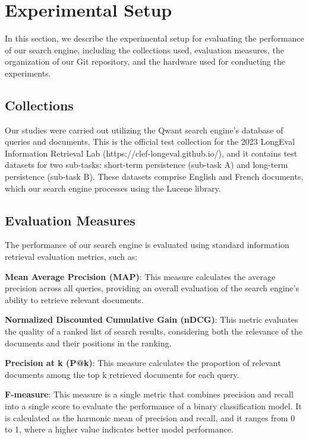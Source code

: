 \section{Experimental Setup}
\label{sec:setup}

In this section, we describe the experimental setup for evaluating the performance of our search engine, including the collections used, evaluation measures, the organization of our Git repository, and the hardware used for conducting the experiments.

\subsection{Collections}
Our studies were carried out utilizing the Qwant search engine's database of queries and documents. This is the official test collection for the 2023 LongEval Information Retrieval Lab (https://clef-longeval.github.io/)\cite{CLEFLongEval}, and it contains test datasets for two sub-tasks: short-term persistence (sub-task A) and long-term persistence (sub-task B). These datasets comprise English and French documents, which our search engine processes using the Lucene library.

\subsection{Evaluation Measures}
The performance of our search engine is evaluated using standard information retrieval evaluation metrics, such as:

\noindent\textbf{Mean Average Precision (MAP)}: This measure calculates the average precision across all queries, providing an overall evaluation of the search engine's ability to retrieve relevant documents.

\noindent\textbf{Normalized Discounted Cumulative Gain (nDCG)}: This metric evaluates the quality of a ranked list of search results, considering both the relevance of the documents and their positions in the ranking.

\noindent\textbf{Precision at k (P@k)}: This measure calculates the proportion of relevant documents among the top k retrieved documents for each query.

\noindent\textbf{F-measure}: This measure is a single metric that combines precision and recall into a single score to evaluate the performance of a binary classification model. It is calculated as the harmonic mean of precision and recall, and it ranges from 0 to 1, where a higher value indicates better model performance.
